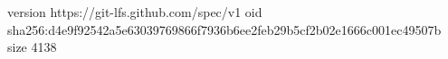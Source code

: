 version https://git-lfs.github.com/spec/v1
oid sha256:d4e9f92542a5e63039769866f7936b6ee2feb29b5cf2b02e1666c001ec49507b
size 4138
